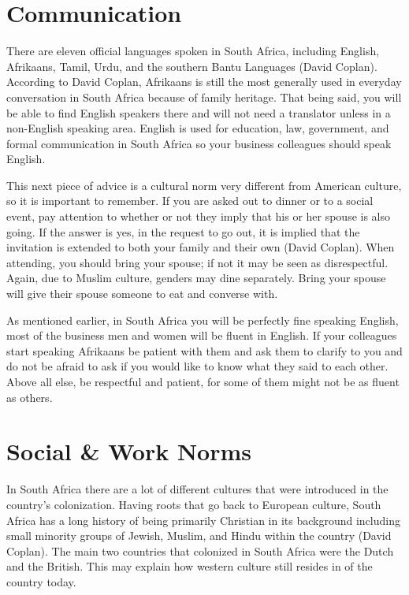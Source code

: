 \documentclass[11pt,a4paper,twoside]{report}
\begin{document}
\section{Communication}

There are eleven official languages spoken in South Africa, including English,
Afrikaans, Tamil, Urdu, and the southern Bantu Languages (David Coplan).
According to David Coplan, Afrikaans is still the most generally used in
everyday conversation in South Africa because of family heritage. That being
said, you will be able to find English speakers there and will not need a
translator unless in a non-English speaking area. English is used for
education, law, government, and formal communication in South Africa so your
business colleagues should speak English.


This next piece of advice is a cultural norm very different from American
culture, so it is important to remember. If you are asked out to dinner or to a
social event, pay attention to whether or not they imply that his or her spouse
is also going. If the answer is yes, in the request to go out, it is implied
that the invitation is extended to both your family and their own (David
Coplan). When attending, you should bring your spouse; if not it may be seen as
disrespectful. Again, due to Muslim culture, genders may dine separately. Bring
your spouse will give their spouse someone to eat and converse with.

As mentioned earlier, in South Africa you will be perfectly fine speaking
English, most of the business men and women will be fluent in English. If your
colleagues start speaking Afrikaans be patient with them and ask them to
clarify to you and do not be afraid to ask if you would like to know what they
said to each other. Above all else, be respectful and patient, for some of them
might not be as fluent as others.

\section{Social \& Work Norms}

In South Africa there are a lot of different cultures that were introduced in
the country’s colonization. Having roots that go back to European culture,
South Africa has a long history of being primarily Christian in its background
including small minority groups of Jewish, Muslim, and Hindu within the country
(David Coplan). The main two countries that colonized in South Africa were the
Dutch and the British. This may explain how western culture still resides in of
the country today.
\end{document}
